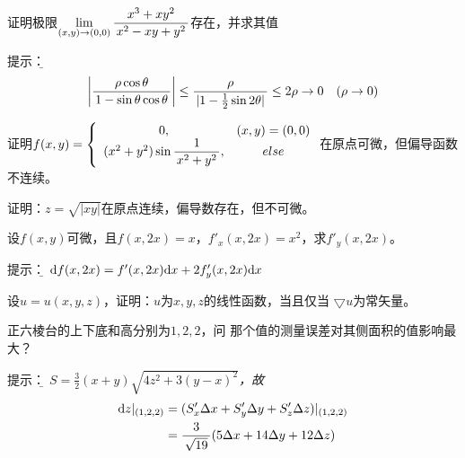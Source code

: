 % 	
% 
% 
% 	
% 

\begin{frame}
	\linespread{1.2}
	证明极限$\lim\limits_{(x,y)\to(0,0)}
	\displaystyle\frac{\,{x^3+xy^2}\,}{\,{x^2-xy+y^2}\,}$存在，并求其值
	
	\pause\alert{提示：}{\it\b  
	$$\left|\displaystyle\frac{\,{\rho\cos\theta}\,}{\,{1-\sin\theta\cos\theta}\,}\right|
	\leq \displaystyle\frac{\,{\rho}\,}{\,{|1-\frac12\sin2\theta|}\,}\leq2\rho\to 0\quad
	(\rho\to 0)$$
	}
\end{frame}

\begin{frame}
	\linespread{2}
	证明$f(x,y)=\left\{\begin{array}{cc}
	0,& (x,y)=(0,0)\\ (x^2+y^2)\sin\displaystyle\frac{\,{1}\,}{\,{x^2+y^2}\,},& else
	\end{array}\right.$在原点可微，但偏导函数不连续。
	
	\vspace{2cm}\pause
	证明：$z=\sqrt{|xy|}$在原点连续，偏导数存在，但不可微。
\end{frame}


\begin{frame}
	\linespread{2}
	设$f(x,y)$可微，且$f(x,2x)=x$，$f'_x(x,2x)=x^2$，求$f'_y(x,2x)$。
	
	\pause\alert{提示：}{\it\b  
	$\mathrm{d} f(x,2x)=f'(x,2x)\mathrm{d} x+2f'_y(x,2x)\mathrm{d} x$
	}
	
	\vspace{2cm}\pause
	设$u=u(x,y,z)$，证明：$u$为$x,y,z$的线性函数，当且仅当
	$\bigtriangledown u$为常矢量。
\end{frame}

\begin{frame}
	\linespread{2}
	正六棱台的上下底和高分别为$1,2,2$，问
	那个值的测量误差对其侧面积的值影响最大？
	
	\pause\alert{提示：}{\it\b  
	$S=\frac32(x+y)\sqrt{4z^2+3(y-x)^2}$，故	
	\begin{align}
	\mathrm{d} z|_{(1,2,2)}&=(S'_x\Delta x+S'_y\Delta y+
	S'_z\Delta z)|_{(1,2,2)}\notag\\
	&=\displaystyle\frac{\,{3}\,}{\,{\sqrt{19}}\,}(5\Delta x+14\Delta y+12\Delta z)\notag
	\end{align}
	}
\end{frame}

